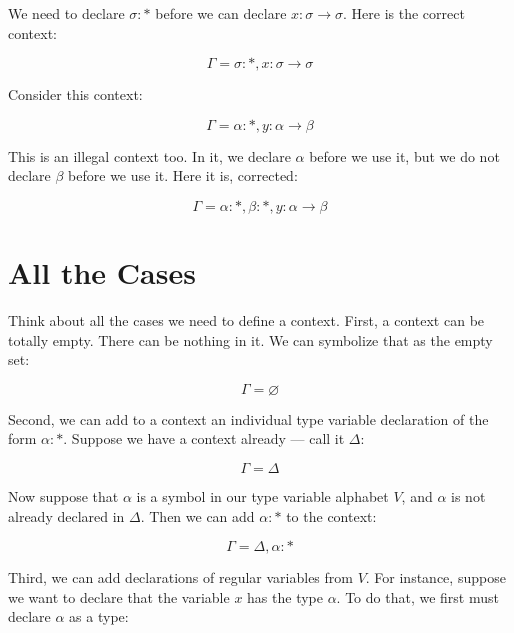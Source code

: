 \documentclass{book}
\numberwithin{equation}{chapter}
\begin{document}
We need to declare $\sigma : *$ before we can declare $x : \sigma \rightarrow \sigma$. Here is the correct context:

\begin{equation}
\Gamma = \sigma : *, x : \sigma \rightarrow \sigma
\end{equation}

\noindent
Consider this context:

\begin{equation}
\Gamma = \alpha : *, y : \alpha \rightarrow \beta
\end{equation}

\noindent
This is an illegal context too. In it, we declare $\alpha$ before we use it, but we do not declare $\beta$ before we use it. Here it is, corrected:

\begin{equation}
\Gamma = \alpha : *, \beta : *, y : \alpha \rightarrow \beta
\end{equation}


\section{All the Cases}

Think about all the cases we need to define a context. First, a context can be totally empty. There can be nothing in it. We can symbolize that as the empty set:

\begin{equation}
\Gamma = \varnothing
\end{equation}

\noindent
Second, we can add to a context an individual type variable declaration of the form $\alpha : *$. Suppose we have a context already --- call it $\Delta$:

\begin{equation}
\Gamma = \Delta
\end{equation}

\noindent
Now suppose that $\alpha$ is a symbol in our type variable alphabet $V$, and $\alpha$ is not already declared in $\Delta$. Then we can add $\alpha :*$ to the context:

\begin{equation}
\Gamma = \Delta, \alpha : *
\end{equation}

\noindent
Third, we can add declarations of regular variables from $V$. For instance, suppose we want to declare that the variable $x$ has the type $\alpha$. To do that, we first must declare $\alpha$ as a type:
\end{document}
